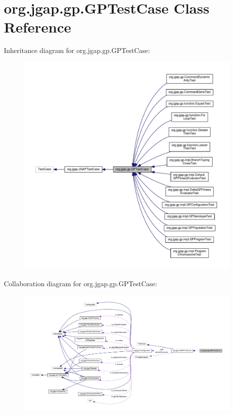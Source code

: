 \hypertarget{classorg_1_1jgap_1_1gp_1_1_g_p_test_case}{\section{org.\-jgap.\-gp.\-G\-P\-Test\-Case Class Reference}
\label{classorg_1_1jgap_1_1gp_1_1_g_p_test_case}
}


Inheritance diagram for org.\-jgap.\-gp.\-G\-P\-Test\-Case\-:
\nopagebreak
\begin{figure}[H]
\begin{center}
\leavevmode
\includegraphics[width=350pt]{classorg_1_1jgap_1_1gp_1_1_g_p_test_case__inherit__graph}
\end{center}
\end{figure}


Collaboration diagram for org.\-jgap.\-gp.\-G\-P\-Test\-Case\-:
\nopagebreak
\begin{figure}[H]
\begin{center}
\leavevmode
\includegraphics[width=350pt]{classorg_1_1jgap_1_1gp_1_1_g_p_test_case__coll__graph}
\end{center}
\end{figure}
